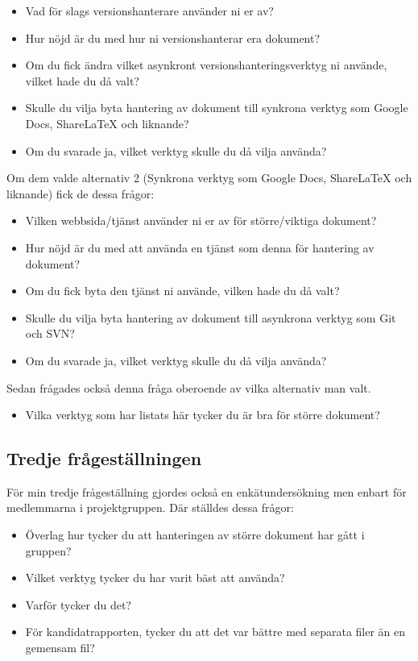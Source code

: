 \begin{itemize}
	\item Vad för slags versionshanterare använder ni er av?
	\item Hur nöjd är du med hur ni versionshanterar era dokument?
	\item Om du fick ändra vilket asynkront versionshanteringsverktyg ni använde, vilket hade du då valt?
	\item Skulle du vilja byta hantering av dokument till synkrona verktyg som Google Docs, ShareLaTeX och liknande?
	\item Om du svarade ja, vilket verktyg skulle du då vilja använda?
\end{itemize}

Om dem valde alternativ 2 (Synkrona verktyg som Google Docs, ShareLaTeX och liknande) fick de dessa frågor:

\begin{itemize}
	\item Vilken webbsida/tjänst använder ni er av för större/viktiga dokument?
	\item Hur nöjd är du med att använda en tjänst som denna för hantering av dokument?
	\item Om du fick byta den tjänst ni använde, vilken hade du då valt?
	\item Skulle du vilja byta hantering av dokument till asynkrona verktyg som Git och SVN?
	\item Om du svarade ja, vilket verktyg skulle du då vilja använda?
\end{itemize}

Sedan frågades också denna fråga oberoende av vilka alternativ man valt.
\begin{itemize}
	\item Vilka verktyg som har listats här tycker du är bra för större dokument?
\end{itemize}

\subsection{Tredje frågeställningen}

För min tredje frågeställning gjordes också en enkätundersökning men enbart för medlemmarna i projektgruppen. Där ställdes dessa frågor:
\begin{itemize}
	\item Överlag hur tycker du att hanteringen av större dokument har gått i gruppen?
	\item Vilket verktyg tycker du har varit bäst att använda?
	\item Varför tycker du det?
	\item För kandidatrapporten, tycker du att det var bättre med separata filer än en gemensam fil?
\end{itemize}

